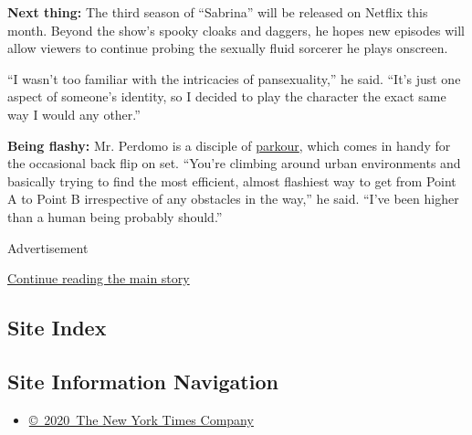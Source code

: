 \textbf{Next thing:} The third season of ``Sabrina'' will be released on
Netflix this month. Beyond the show's spooky cloaks and daggers, he
hopes new episodes will allow viewers to continue probing the sexually
fluid sorcerer he plays onscreen.

``I wasn't too familiar with the intricacies of pansexuality,'' he said.
``It's just one aspect of someone's identity, so I decided to play the
character the exact same way I would any other.''

\textbf{Being flashy:} Mr. Perdomo is a disciple of
\href{https://www.nytimes.com/2017/02/03/magazine/how-to-walk-on-hand-rails.html}{parkour},
which comes in handy for the occasional back flip on set. ``You're
climbing around urban environments and basically trying to find the most
efficient, almost flashiest way to get from Point A to Point B
irrespective of any obstacles in the way,'' he said. ``I've been higher
than a human being probably should.''

Advertisement

\protect\hyperlink{after-bottom}{Continue reading the main story}

\hypertarget{site-index}{%
\subsection{Site Index}\label{site-index}}

\hypertarget{site-information-navigation}{%
\subsection{Site Information
Navigation}\label{site-information-navigation}}

\begin{itemize}
\tightlist
\item
  \href{https://help.nytimes.com/hc/en-us/articles/115014792127-Copyright-notice}{©~2020~The
  New York Times Company}
\end{itemize}

